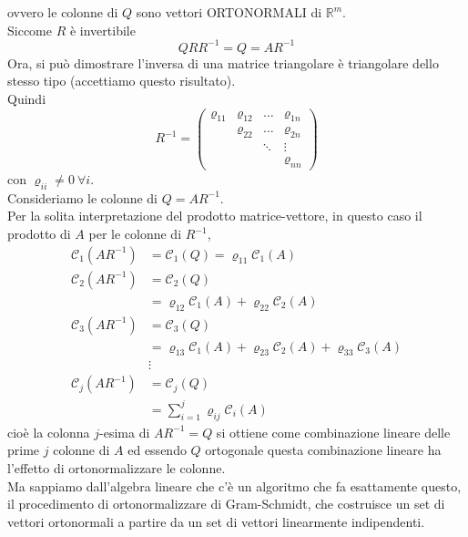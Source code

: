 \documentclass[12pt,a4paper]{article}
\begin{document}
ovvero le colonne di $Q$ sono vettori ORTONORMALI di $\mathbb{R}^m$. \\
Siccome $R$ è invertibile 
\begin{equation*}
    QRR^{-1} = Q = AR^{-1}
\end{equation*}
Ora, si può dimostrare l'inversa di una matrice triangolare è triangolare dello stesso tipo (accettiamo questo risultato). \\
Quindi
\begin{equation*}
    R^{-1}=\begin{pmatrix}
         \varrho_{11} & \varrho_{12} & \dots & \varrho_{1n} \\
          & \varrho_{22} & \dots & \varrho_{2n} \\
          & & \ddots & \vdots \\
          & & & \varrho_{nn} 
    \end{pmatrix}
\end{equation*}
con $\varrho_{ii}\neq 0 \ \forall i$.\\
Consideriamo le colonne di $Q=AR^{-1}$. \\
Per la solita interpretazione del prodotto matrice-vettore, in questo caso il prodotto di $A$ per le colonne di $R^{-1}$,
\begin{align*}
    \mathcal{C}_1(AR^{-1}) & = \mathcal{C}_1(Q)=\varrho_{11}\mathcal{C}_1(A) \\
    \mathcal{C}_2(AR^{-1}) & =\mathcal{C}_2(Q)\\
        &=\varrho_{12}\mathcal{C}_1(A) + \varrho_{22}\mathcal{C}_2(A) \\
    \mathcal{C}_3(AR^{-1})& =\mathcal{C}_3(Q)\\
        &=\varrho_{13}\mathcal{C}_1(A) + \varrho_{23}\mathcal{C}_2(A) + \varrho_{33}\mathcal{C}_3(A) \\
        &\vdots \\
    \mathcal{C}_j(AR^{-1}) & = \mathcal{C}_j(Q) \\
        &=\sum_{i=1}^j\varrho_{ij}\mathcal{C}_i(A)    
\end{align*}
cioè la colonna $j$-esima di $AR^{-1}=Q$ si ottiene come combinazione lineare delle prime $j$ colonne di $A$ ed essendo $Q$ ortogonale questa combinazione lineare ha l'effetto di ortonormalizzare le colonne.\\
Ma sappiamo dall'algebra lineare che c'è un algoritmo che fa esattamente questo, il procedimento di ortonormalizzare di Gram-Schmidt, che costruisce un set di vettori ortonormali a partire da un set di vettori linearmente indipendenti.\\
\end{document}
